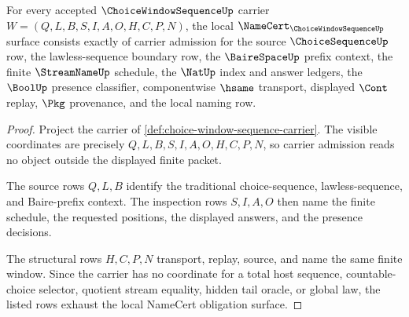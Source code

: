 \begin{theorem}
\label{thm:choice-window-sequence-carrier-admission}
For every accepted $\ChoiceWindowSequenceUp$ carrier $W=(Q,L,B,S,I,A,O,H,C,P,N)$, the local $\NameCert_{\ChoiceWindowSequenceUp}$ surface consists exactly of carrier admission for the source $\ChoiceSequenceUp$ row, the lawless-sequence boundary row, the $\BaireSpaceUp$ prefix context, the finite $\StreamNameUp$ schedule, the $\NatUp$ index and answer ledgers, the $\BoolUp$ presence classifier, componentwise $\hsame$ transport, displayed $\Cont$ replay, $\Pkg$ provenance, and the local naming row.
\end{theorem}
\begin{proof}
Project the carrier of \autoref{def:choice-window-sequence-carrier}. The visible coordinates are precisely $Q,L,B,S,I,A,O,H,C,P,N$, so carrier admission reads no object outside the displayed finite packet.

The source rows $Q,L,B$ identify the traditional choice-sequence, lawless-sequence, and Baire-prefix context. The inspection rows $S,I,A,O$ then name the finite schedule, the requested positions, the displayed answers, and the presence decisions.

The structural rows $H,C,P,N$ transport, replay, source, and name the same finite window. Since the carrier has no coordinate for a total host sequence, countable-choice selector, quotient stream equality, hidden tail oracle, or global law, the listed rows exhaust the local NameCert obligation surface.
\end{proof}

